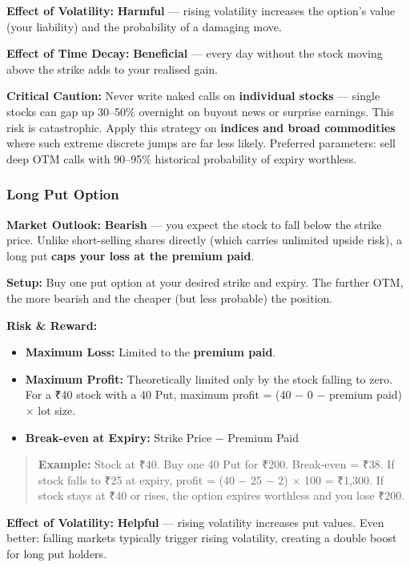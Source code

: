 \documentclass[12pt,openany]{book}
\begin{document}
\textbf{Effect of Volatility:} \textbf{Harmful} — rising volatility increases the option's value (your liability) and the probability of a damaging move.

\textbf{Effect of Time Decay:} \textbf{Beneficial} — every day without the stock moving above the strike adds to your realised gain.

\textbf{Critical Caution:} Never write naked calls on \textbf{individual stocks} — single stocks can gap up 30–50\% overnight on buyout news or surprise earnings. This risk is catastrophic. Apply this strategy on \textbf{indices and broad commodities} where such extreme discrete jumps are far less likely. Preferred parameters: sell deep OTM calls with 90–95\% historical probability of expiry worthless.


\subsubsection{Long Put Option}

\textbf{Market Outlook:} \textbf{Bearish} — you expect the stock to fall below the strike price. Unlike short-selling shares directly (which carries unlimited upside risk), a long put \textbf{caps your loss at the premium paid}.

\textbf{Setup:} Buy one put option at your desired strike and expiry. The further OTM, the more bearish and the cheaper (but less probable) the position.

\textbf{Risk \& Reward:}
\begin{itemize}[leftmargin=*]
    \item \textbf{Maximum Loss:} Limited to the \textbf{premium paid}.
    \item \textbf{Maximum Profit:} Theoretically limited only by the stock falling to zero. For a ₹40 stock with a 40 Put, maximum profit = (40 − 0 − premium paid) × lot size.
    \item \textbf{Break-even at Expiry:} Strike Price − Premium Paid
\end{itemize}

\begin{quote}
\textbf{Example:} Stock at ₹40. Buy one 40 Put for ₹200. Break-even = ₹38. If stock falls to ₹25 at expiry, profit = (40 − 25 − 2) × 100 = ₹1,300. If stock stays at ₹40 or rises, the option expires worthless and you lose ₹200.
\end{quote}

\textbf{Effect of Volatility:} \textbf{Helpful} — rising volatility increases put values. Even better: falling markets typically trigger rising volatility, creating a double boost for long put holders.
\end{document}
